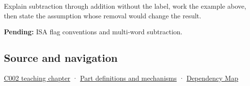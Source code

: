 Explain subtraction through addition without the label, work the example above, then state the assumption whose removal would change the result.

\textbf{Pending:} ISA flag conventions and multi-word subtraction.

\subsection{Source and navigation}\label{appendix-1c7df340573e-source-and-navigation}

\hyperref[01-foundations-i-ch001-arithmetic-becomes-a-policy]{C002 teaching chapter} · \hyperref[appendix-fd090d982a15]{Part definitions and mechanisms} · \hyperref[appendix-4ad47bdd269a]{Dependency Map}
